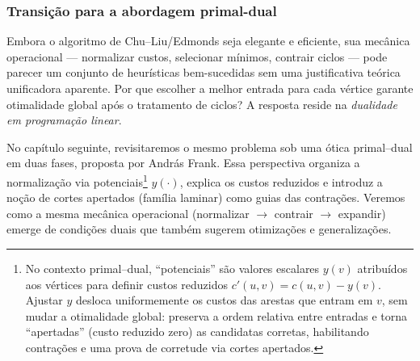 \subsubsection{Transição para a abordagem primal-dual}

Embora o algoritmo de Chu–Liu/Edmonds seja elegante e eficiente, sua mecânica operacional — normalizar custos, selecionar mínimos, contrair ciclos — pode parecer um conjunto de heurísticas bem-sucedidas sem uma justificativa teórica unificadora aparente. Por que escolher a melhor entrada para cada vértice garante otimalidade global após o tratamento de ciclos? A resposta reside na \emph{dualidade em programação linear}.


No capítulo seguinte, revisitaremos o mesmo problema sob uma ótica primal–dual em duas fases, proposta por András Frank. Essa perspectiva organiza a normalização via potenciais\footnote{No contexto primal–dual, “potenciais” são valores escalares \(y(v)\) atribuídos aos vértices para definir custos reduzidos \(c'(u,v)=c(u,v)-y(v)\). Ajustar \(y\) desloca uniformemente os custos das arestas que entram em \(v\), sem mudar a otimalidade global: preserva a ordem relativa entre entradas e torna “apertadas” (custo reduzido zero) as candidatas corretas, habilitando contrações e uma prova de corretude via cortes apertados.} \(y(\cdot)\), explica os custos reduzidos e introduz a noção de cortes apertados (família laminar) como guias das contrações. Veremos como a mesma mecânica operacional (normalizar \(\to\) contrair \(\to\) expandir) emerge de condições duais que também sugerem otimizações e generalizações.
